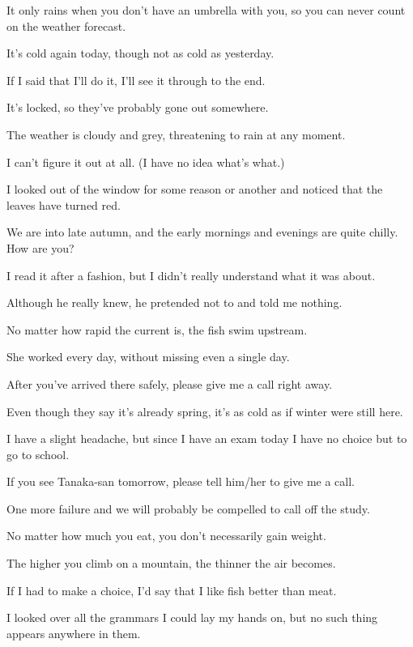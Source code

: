 \item[1.] It only rains when you don't have an umbrella with you, so you can never count on the weather forecast.
\item[2.] It's cold again today, though not as cold as yesterday.
\item[3.] If I said that I'll do it, I'll see it through to the end.
\item[4.] It's locked, so they've probably gone out somewhere.
\item[5.] The weather is cloudy and grey, threatening to rain at any moment.
\item[6.] I can't figure it out at all. (I have no idea what's what.)
\item[7.] I looked out of the window for some reason or another and noticed that the leaves have turned red.
\item[8.] We are into late autumn, and the early mornings and evenings are quite chilly. How are you?
\item[9.] I read it after a fashion, but I didn't really understand what it was about.
\item[10.] Although he really knew, he pretended not to and told me nothing.
\item[11.] No matter how rapid the current is, the fish swim upstream.
\item[12.] She worked every day, without missing even a single day.
\item[13.] After you've arrived there safely, please give me a call right away.
\item[14.] Even though they say it's already spring, it's as cold as if winter were still here.
\item[15.] I have a slight headache, but since I have an exam today I have no choice but to go to school.
\item[16.] If you see Tanaka-san tomorrow, please tell him/her to give me a call.
\item[17.] One more failure and we will probably be compelled to call off the study.
\item[18.] No matter how much you eat, you don't necessarily gain weight.
\item[19.] The higher you climb on a mountain, the thinner the air becomes.
\item[20.] If I had to make a choice, I'd say that I like fish better than meat.
\item[21.] I looked over all the grammars I could lay my hands on, but no such thing appears anywhere in them.
